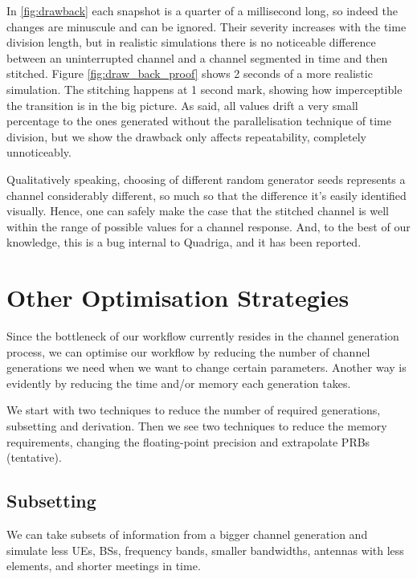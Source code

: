 

In \ref{fig:drawback} each snapshot is a quarter of a millisecond long, so indeed the changes are minuscule and can be ignored. Their severity increases with the time division length, but in realistic simulations there is no noticeable difference between an uninterrupted channel and a channel segmented in time and then stitched. Figure \ref{fig:draw_back_proof} shows 2 seconds of a more realistic simulation. The stitching happens at 1 second mark, showing how imperceptible the transition is in the big picture. As said, all values drift a very small percentage to the ones generated without the parallelisation technique of time division, but we show the drawback only affects repeatability, completely unnoticeably.



Qualitatively speaking, choosing of different random generator seeds represents a channel considerably different, so much so that the difference it's easily identified visually. Hence, one can safely make the case that the stitched channel is well within the range of possible values for a channel response. And, to the best of our knowledge, this is a bug internal to Quadriga, and it has been reported.

\section{Other Optimisation Strategies} \label{optimisation_strats}

Since the bottleneck of our workflow currently resides in the channel generation process, we can optimise our workflow by reducing the number of channel generations we need when we want to change certain parameters. Another way is evidently by reducing the time and/or memory each generation takes.

We start with two techniques to reduce the number of required generations, subsetting and derivation. Then we see two techniques to reduce the memory requirements, changing the floating-point precision and extrapolate PRBs (tentative).

\subsection*{Subsetting}

We can take subsets of information from a bigger channel generation and simulate less UEs, BSs, frequency bands, smaller bandwidths, antennas with less elements, and shorter meetings in time.

